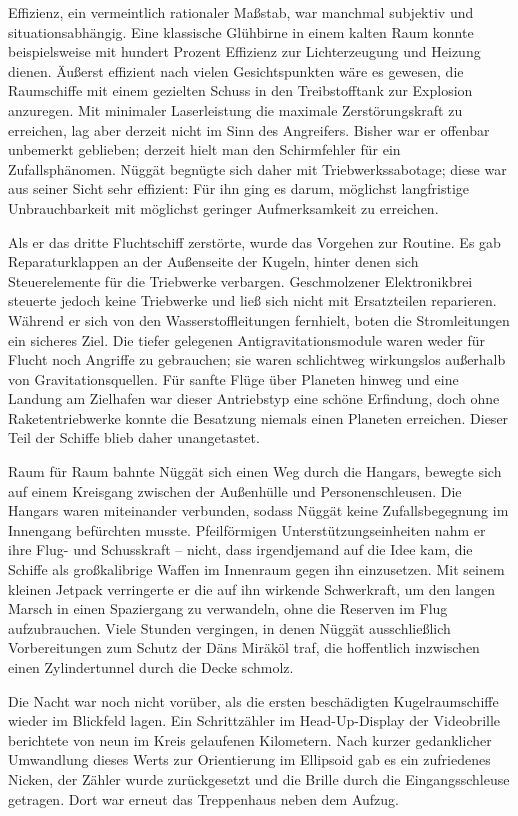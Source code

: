 Effizienz, ein vermeintlich rationaler Maßstab, war manchmal subjektiv und situationsabhängig. Eine klassische Glühbirne in einem kalten Raum konnte beispielsweise mit hundert Prozent Effizienz zur Lichterzeugung und Heizung dienen. Äußerst effizient nach vielen Gesichtspunkten wäre es gewesen, die Raumschiffe mit einem gezielten Schuss in den Treibstofftank zur Explosion anzuregen. Mit minimaler Laserleistung die maximale Zerstörungskraft zu erreichen, lag aber derzeit nicht im Sinn des Angreifers. Bisher war er offenbar unbemerkt geblieben; derzeit hielt man den Schirmfehler für ein Zufallsphänomen. Nüggät begnügte sich daher mit Triebwerkssabotage; diese war aus seiner Sicht sehr effizient: Für ihn ging es darum, möglichst langfristige Unbrauchbarkeit mit möglichst geringer Aufmerksamkeit zu erreichen.

Als er das dritte Fluchtschiff zerstörte, wurde das Vorgehen zur Routine. Es gab Reparaturklappen an der Außenseite der Kugeln, hinter denen sich Steuerelemente für die Triebwerke verbargen. Geschmolzener Elektronikbrei steuerte jedoch keine Triebwerke und ließ sich nicht mit Ersatzteilen reparieren. Während er sich von den Wasserstoffleitungen fernhielt, boten die Stromleitungen ein sicheres Ziel. Die tiefer gelegenen Antigravitationsmodule waren weder für Flucht noch Angriffe zu gebrauchen; sie waren schlichtweg wirkungslos außerhalb von Gravitationsquellen. Für sanfte Flüge über Planeten hinweg und eine Landung am Zielhafen war dieser Antriebstyp eine schöne Erfindung, doch ohne Raketentriebwerke konnte die Besatzung niemals einen Planeten erreichen. Dieser Teil der Schiffe blieb daher unangetastet.

Raum für Raum bahnte Nüggät sich einen Weg durch die Hangars, bewegte sich auf einem Kreisgang zwischen der Außenhülle und Personenschleusen. Die Hangars waren miteinander verbunden, sodass Nüggät keine Zufallsbegegnung im Innengang befürchten musste. Pfeilförmigen Unterstützungseinheiten nahm er ihre Flug- und Schusskraft – nicht, dass irgendjemand auf die Idee kam, die Schiffe als großkalibrige Waffen im Innenraum gegen ihn einzusetzen. Mit seinem kleinen Jetpack verringerte er die auf ihn wirkende Schwerkraft, um den langen Marsch in einen Spaziergang zu verwandeln, ohne die Reserven im Flug aufzubrauchen. Viele Stunden vergingen, in denen Nüggät ausschließlich Vorbereitungen zum Schutz der Däns Miräköl traf, die hoffentlich inzwischen einen Zylindertunnel durch die Decke schmolz.

Die Nacht war noch nicht vorüber, als die ersten beschädigten Kugelraumschiffe wieder im Blickfeld lagen. Ein Schrittzähler im Head-Up-Display der Videobrille berichtete von neun im Kreis gelaufenen Kilometern. Nach kurzer gedanklicher Umwandlung dieses Werts zur Orientierung im Ellipsoid gab es ein zufriedenes Nicken, der Zähler wurde zurückgesetzt und die Brille durch die Eingangsschleuse getragen. Dort war erneut das Treppenhaus neben dem Aufzug.

